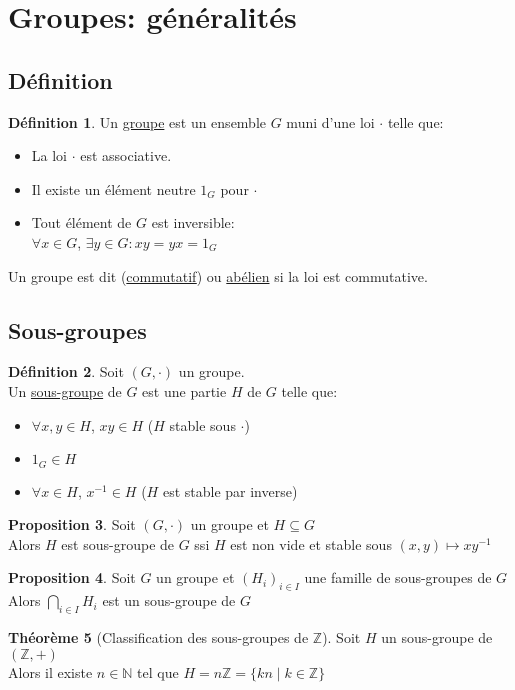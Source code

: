 \documentclass[10pt,a4paper]{article}
\theoremstyle{definition}
\newtheorem{proposition}{Proposition}[section]
\newtheorem{theorem}[proposition]{Théorème}
\newtheorem{definition}[proposition]{Définition}
\begin{document}
\section{Groupes: généralités}
\subsection{Définition}
\begin{definition}
Un \uline{groupe} est un ensemble $G$ muni d'une loi $\cdot$ telle que:
\begin{itemize}
\item La loi $\cdot$ est associative.
\item Il existe un élément neutre $1_G$ pour $\cdot$
\item Tout élément de $G$ est inversible: \\
$\forall x \in G$, $\exists y \in G: xy = yx = 1_G$
\end{itemize}
Un groupe est dit (\uline{commutatif}) ou \uline{abélien} si la loi est commutative.
\end{definition}

\subsection{Sous-groupes}
\begin{definition}
Soit $(G, \cdot)$ un groupe. \\
Un \uline{sous-groupe} de $G$ est une partie $H$ de $G$ telle que:
\begin{itemize}
\item $\forall x, y \in H$, $xy \in H$ \quad ($H$ stable sous $\cdot$)
\item $1_G \in H$
\item $\forall x \in H$, $x^{-1} \in H$ \quad ($H$ est stable par inverse)
\end{itemize}
\end{definition}
\begin{proposition}
Soit $(G, \cdot)$ un groupe et $H \subseteq G$ \\
Alors $H$ est sous-groupe de $G$ ssi $H$ est non vide  et stable sous $(x, y) \mapsto x y^{-1}$
\end{proposition}
\begin{proposition}
Soit $G$ un groupe et $(H_i)_{i \in I}$ une famille de sous-groupes de $G$ \\
Alors $\bigcap\limits_{i \in I} H_i$ est un sous-groupe de $G$
\end{proposition}
\begin{theorem}[Classification des sous-groupes de $\mathbb{Z}$]
Soit $H$ un sous-groupe de $(\mathbb{Z}, +)$ \\
Alors il existe $n \in \mathbb{N}$ tel que $H = n\mathbb{Z} = \{kn \mid k \in \mathbb{Z} \}$
\end{theorem}
\end{document}
